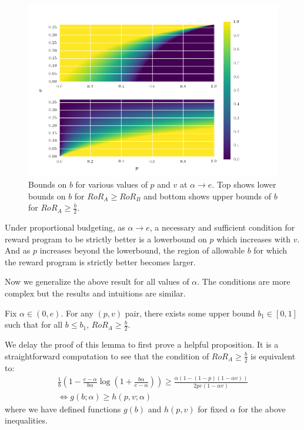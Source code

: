 \begin{figure}[h!]
\begin{centering}
\includegraphics[scale = 0.75]{./figures/b_bounds.png}
\caption{Bounds on $b$ for various values of $p$ and $v$ at $\alpha \rightarrow e$. Top shows lower bounds on $b$ for $RoR_A \geq RoR_B$ and bottom shows upper bounds of $b$ for $RoR_A \geq \frac{b}{2}$.}
\label{fig:b_restrictions}
\end{centering}
\end{figure}

\begin{theorem}
Under proportional budgeting, as $\alpha\rightarrow e$, a necessary and sufficient condition for reward program to be strictly better is a lowerbound on $p$ which increases with $v$.  
And as $p$ increases beyond the lowerbound, the region of allowable $b$ for which the reward program is strictly better becomes larger. 
\end{theorem}

Now we generalize the above result for all values of $\alpha$. The conditions are more complex but the results and intuitions are similar. 

\begin{lemma}
Fix $\alpha \in (0, e)$. For any $(p,v)$ pair, there exists some upper bound $b_1 \in [0,1]$ such that for all $b \leq b_1$, $RoR_A \geq \frac{b}{2}$.
\end{lemma}

\proof
We delay the proof of this lemma to first prove a helpful proposition. It is a straightforward computation to see that the condition of $RoR_A \geq \frac{b}{2}$ is equivalent to:
\begin{gather*}
\frac{1}{b}\left(1-\frac{e-\alpha}{b\alpha}\log \left(1+\frac{b\alpha}{e-\alpha} \right) \right) \geq \frac{\alpha(1-(1-p)(1-\alpha v))}{2pe(1-\alpha v)} \\
\iff
g(b; \alpha) \geq h(p, v; \alpha)
\end{gather*}
where we have defined functions $g(b)$ and $h(p,v)$ for fixed $\alpha$ for the above inequalities. 

